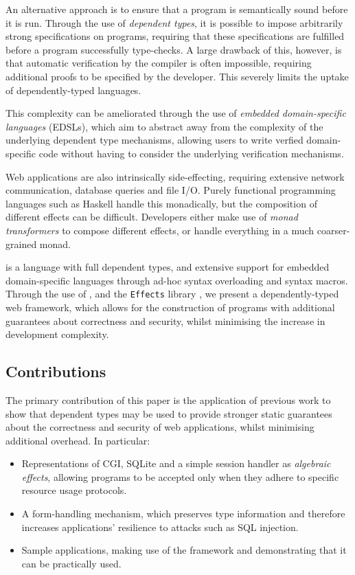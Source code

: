\documentclass[preprint]{sigplanconf}
\begin{document}
An alternative approach is to ensure that a program is semantically sound before it is run. Through the use of \textit{dependent types}, it is possible to impose arbitrarily strong specifications on programs, requiring that these specifications are fulfilled before a program successfully type-checks. A large drawback of this, however, is that automatic verification by the compiler is often impossible, requiring additional proofs to be specified by the developer. This severely limits the uptake of dependently-typed languages.

This complexity can be ameliorated through the use of \textit{embedded domain-specific languages} (EDSLs), which aim to abstract away from the complexity of the underlying dependent type mechanisms, allowing users to write verfied domain-specific code without having to consider the underlying verification mechanisms.   %

Web applications are also intrinsically side-effecting, requiring extensive network communication, database queries and file I/O. Purely functional programming languages such as Haskell \cite{haskell} handle this monadically, but the composition of different effects can be difficult. Developers either make use of \textit{monad transformers} to compose different effects, or handle everything in a much coarser-grained monad.

\idris{} \cite{} is a language with full dependent types, and extensive support for embedded domain-specific languages through ad-hoc syntax overloading and syntax macros. Through the use of \idris{}, and the \texttt{Effects} library \cite{}, we present a dependently-typed web framework, which allows for the construction of programs with additional guarantees about correctness and security, whilst minimising the increase in development complexity. 



\subsection{Contributions}
The primary contribution of this paper is the application of previous work to show that dependent types may be used to provide stronger static guarantees about the correctness and security of web applications, whilst minimising additional overhead. In particular:

\begin{itemize}
\item Representations of CGI, SQLite and a simple session handler as \textit{algebraic effects}, allowing programs to be accepted only when they adhere to specific resource usage protocols.
\item A form-handling mechanism, which preserves type information and therefore increases applications' resilience to attacks such as SQL injection.
\item Sample applications, making use of the framework and demonstrating that it can be practically used.
\end{itemize}
\end{document}
